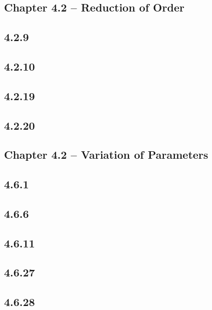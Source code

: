 \documentclass{article}
\begin{document}
    
\subsection{Chapter 4.2 -- Reduction of Order}

\subsection{4.2.9}
\subsection{4.2.10}
\subsection{4.2.19}
\subsection{4.2.20}

\subsection{Chapter 4.2 -- Variation of Parameters}

\subsection{4.6.1}
\subsection{4.6.6}
\subsection{4.6.11}
\subsection{4.6.27}
\subsection{4.6.28}
\end{document}
